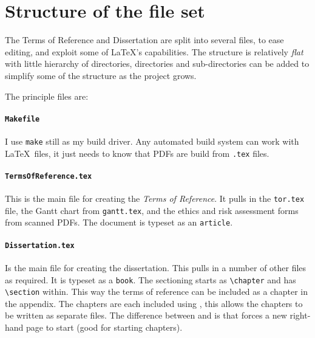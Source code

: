 
\section{Structure of the file set}
The Terms of Reference and Dissertation are split into several files, to ease
editing, and exploit some of \LaTeX's capabilities.
The structure is relatively \emph{flat} with little hierarchy of directories,
directories and sub-directories can be added to simplify some of the structure
as the project grows.

The principle files are:

\paragraph{\texttt{Makefile}} I use \texttt{make} still as my build driver.
Any automated build system can work with \LaTeX\ files, it just needs to know
that PDFs are build from \texttt{.tex} files.

\paragraph{\texttt{TermsOfReference.tex}} This is the main file for creating
the \emph{Terms of Reference}.  It pulls in the \texttt{tor.tex} file, the
Gantt chart from \texttt{gantt.tex}, and the ethics and risk assessment forms
from scanned PDFs.  The document is typeset as an \texttt{article}.

\paragraph{\texttt{Dissertation.tex}} Is the main file for creating the
dissertation.   This pulls in a number of other files as required.	
It is typeset as a \texttt{book}.  The sectioning starts as \verb'\chapter'
and has \verb'\section'  within.  This way the terms of reference can be
included as a chapter in the appendix.
The chapters are each included using \verb'',  this allows the
chapters to be written as separate files.  The difference between
\verb'' and \verb'' is that \verb'' forces a new
right-hand page to start (good for starting chapters).

